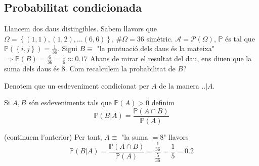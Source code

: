 \documentclass[../main.tex]{subfiles}
\begin{document}
    \subsection{Probabilitat condicionada}
    \begin{exemple}
        Llancem dos daus distingibles. Sabem llavors que \\$\Omega = \left\{ \left(1,1\right), \left(1,2\right), \dots  \left(6,6\right) \right\}$,
        $\#\Omega = 36$ simètric. $\mathcal{A} = \mathcal{P}\left(\Omega\right)$, $\mathbb{P}$ és
        tal que $\mathbb{P}\left(\left\{i,j\right\} \right) = \frac{1}{36}$. Sigui $B \equiv $ "la
        puntuació dels daus és la mateixa" $\Rightarrow \mathbb{P}\left(B\right) = \frac{6}{36} = \frac{1}{6} \approx 0.17$
        Abans de mirar el resultat del dau, ens diuen que la suma dels daus és $8$. Com recalculem
        la probabilitat de $B$?
    \end{exemple}
    \begin{notacio}
        Denotem que un esdeveniment condicionat per $A$ de la manera $..|A$.
    \end{notacio}
    \begin{definicio}
        Si $A, B$ són esdeveniments tals que $\mathbb{P}\left(A\right)>0$ definim
        \begin{displaymath}
            \mathbb{P}\left(B|A\right) = \frac{\mathbb{P}\left(A\cap B\right)}{\mathbb{P}\left(A\right)}
        \end{displaymath}
    \end{definicio}
    \begin{exemple}(continuem l'anterior)
        Per tant, $A \equiv$ "la suma $=8$" llavors
        \begin{displaymath}
            \mathbb{P}\left(B|A\right) = \frac{\mathbb{P}\left(A\cap B\right)}{\mathbb{P}\left(A\right)} = \frac{\frac{1}{36}}{\frac{5}{36}} = \frac{1}{5} = 0.2 
        \end{displaymath}
    \end{exemple}
\end{document}
